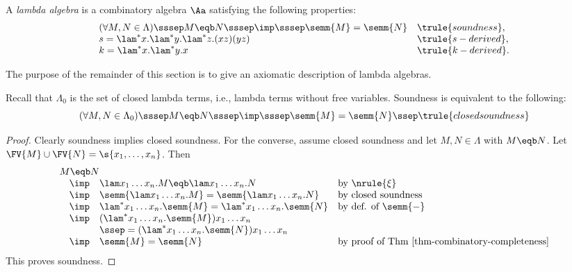 \documentclass[12pt]{article}
\begin{document}
\begin{definition}
  A {\em lambda algebra} is a combinatory algebra $\Aa$ satisfying the
  following properties: 
  \[\begin{array}{l@{~~~}l}
    (\forall M,N\in\Lambda)\sssep M\eqb N \sssep\imp\sssep \semm{M}=\semm{N}& \trule{soundness},\\
    s = \lam^*x.\lam^*y.\lam^*z.(xz)(yz) &\trule{s-derived},\\
    k = \lam^*x.\lam^*y.x &\trule{k-derived}.\\
  \end{array}
  \]
\end{definition}

The purpose of the remainder of this section is to give an axiomatic
description of lambda algebras.

\begin{lemma}
  Recall that $\Lambda_0$ is the set of closed lambda terms, i.e.,
  lambda terms without free variables. Soundness is equivalent to the
  following:
  \[
  (\forall M,N\in\Lambda_0)\sssep M\eqb N \sssep\imp\sssep \semm{M}=\semm{N}
  \ssep\trule{closed soundness}
  \]
\end{lemma}

\begin{proof}
  Clearly soundness implies closed soundness. For the converse, assume
  closed soundness and let $M,N\in\Lambda$ with $M\eqb N$. Let
  $\FV{M}\cup\FV{N}=\s{x_1,\ldots,x_n}$.  Then
  \[ \begin{array}{llll}
    \multicolumn{3}{l}{M\eqb N} \\
    &\imp& \lam x_1\ldots x_n.M\eqb \lam x_1\ldots x_n.N & \mbox{by $\nrule{\xi}$} \\
    &\imp& \semm{\lam x_1\ldots x_n.M}=\semm{\lam x_1\ldots x_n.N} & \mbox{by closed soundness} \\
    &\imp& \lam^* x_1\ldots x_n.\semm{M} = \lam^* x_1\ldots x_n.\semm{N} & \mbox{by def. of $\semm{-}$} \\
    &\imp& (\lam^* x_1\ldots x_n.\semm{M})x_1\ldots x_n \\
    &&  \ssep= (\lam^* x_1\ldots x_n.\semm{N})x_1\ldots x_n \\
    &\imp& \semm{M}=\semm{N} &\mbox{by proof of Thm~\ref{thm-combinatory-completeness}}
  \end{array}
  \]
  This proves soundness.\eot
\end{proof}
\end{document}
